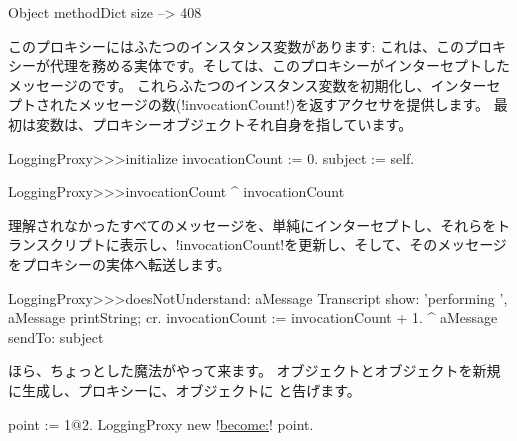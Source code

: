 \documentclass[a4paper,10pt,twoside]{book}
\begin{document}
\begin{code}{}
Object methodDict size --> 408
\end{code}

このプロキシーにはふたつのインスタンス変数があります:  これは、このプロキシーが代理を務める実体です。そしては、このプロキシーがインターセプトしたメッセージのです。%
これらふたつのインスタンス変数を初期化し、インターセプトされたメッセージの数(\ct!invocationCount!)を返すアクセサを提供します。
最初は変数は、プロキシーオブジェクトそれ自身を指しています。
\begin{code}{}
LoggingProxy>>>initialize
	invocationCount := 0.
	subject := self.
\end{code}

\begin{code}{}
LoggingProxy>>>invocationCount
	^ invocationCount
\end{code}

理解されなかったすべてのメッセージを、単純にインターセプトし、それらをトランスクリプトに表示し、\ct!invocationCount!を更新し、そして、そのメッセージをプロキシーの実体へ転送します。
\begin{code}{}
LoggingProxy>>>doesNotUnderstand: aMessage 
	Transcript show: 'performing ', aMessage printString; cr.
	invocationCount := invocationCount + 1.
	^ aMessage sendTo: subject
\end{code}

ほら、ちょっとした魔法がやって来ます。%
オブジェクトとオブジェクトを新規に生成し、プロキシーに、オブジェクトに と告げます。
\begin{code}{}
point := 1@2.
LoggingProxy new !\underline{become:}! point.
\end{code}
\end{document}
